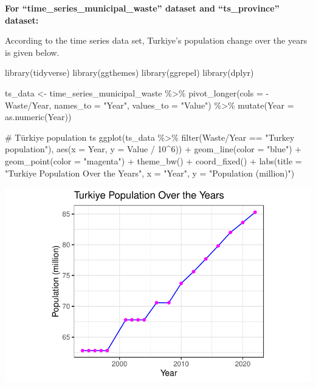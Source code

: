 \documentclass[
  11pt,
  a4paper,
  DIV=11,
  numbers=noendperiod]{scrartcl}
\newenvironment{Shaded}{\begin{snugshade}}{\end{snugshade}}
\newcommand{\AttributeTok}[1]{\textcolor[rgb]{0.40,0.45,0.13}{#1}}
\newcommand{\CommentTok}[1]{\textcolor[rgb]{0.37,0.37,0.37}{#1}}
\newcommand{\DecValTok}[1]{\textcolor[rgb]{0.68,0.00,0.00}{#1}}
\newcommand{\FunctionTok}[1]{\textcolor[rgb]{0.28,0.35,0.67}{#1}}
\newcommand{\NormalTok}[1]{\textcolor[rgb]{0.00,0.23,0.31}{#1}}
\newcommand{\OtherTok}[1]{\textcolor[rgb]{0.00,0.23,0.31}{#1}}
\newcommand{\SpecialCharTok}[1]{\textcolor[rgb]{0.37,0.37,0.37}{#1}}
\newcommand{\StringTok}[1]{\textcolor[rgb]{0.13,0.47,0.30}{#1}}
\begin{document}
{\textbf{For ``time\_series\_municipal\_waste'' dataset and
``ts\_province'' dataset:}}

According to the time series data set, Turkiye's population change over
the years is given below.

\begin{Shaded}
\begin{Highlighting}[]
\FunctionTok{library}\NormalTok{(tidyverse)}
\FunctionTok{library}\NormalTok{(ggthemes)}
\FunctionTok{library}\NormalTok{(ggrepel)}
\FunctionTok{library}\NormalTok{(dplyr)}

\NormalTok{ts\_data }\OtherTok{\textless{}{-}}\NormalTok{ time\_series\_municipal\_waste }\SpecialCharTok{\%\textgreater{}\%}
  \FunctionTok{pivot\_longer}\NormalTok{(}\AttributeTok{cols =} \SpecialCharTok{{-}}\StringTok{\textasciigrave{}}\AttributeTok{Waste/Year}\StringTok{\textasciigrave{}}\NormalTok{, }\AttributeTok{names\_to =} \StringTok{"Year"}\NormalTok{, }\AttributeTok{values\_to =} \StringTok{"Value"}\NormalTok{) }\SpecialCharTok{\%\textgreater{}\%}
  \FunctionTok{mutate}\NormalTok{(}\AttributeTok{Year =} \FunctionTok{as.numeric}\NormalTok{(Year))  }

\CommentTok{\# Türkiye population ts}
\FunctionTok{ggplot}\NormalTok{(ts\_data }\SpecialCharTok{\%\textgreater{}\%} \FunctionTok{filter}\NormalTok{(}\StringTok{\textasciigrave{}}\AttributeTok{Waste/Year}\StringTok{\textasciigrave{}} \SpecialCharTok{==} \StringTok{"Turkey population"}\NormalTok{), }
                          \FunctionTok{aes}\NormalTok{(}\AttributeTok{x =}\NormalTok{ Year, }\AttributeTok{y =}\NormalTok{ Value }\SpecialCharTok{/} \DecValTok{10}\SpecialCharTok{\^{}}\DecValTok{6}\NormalTok{)) }\SpecialCharTok{+}
  \FunctionTok{geom\_line}\NormalTok{(}\AttributeTok{color =} \StringTok{"blue"}\NormalTok{) }\SpecialCharTok{+}
  \FunctionTok{geom\_point}\NormalTok{(}\AttributeTok{color =} \StringTok{"magenta"}\NormalTok{) }\SpecialCharTok{+}
  \FunctionTok{theme\_bw}\NormalTok{() }\SpecialCharTok{+} \FunctionTok{coord\_fixed}\NormalTok{() }\SpecialCharTok{+}
  \FunctionTok{labs}\NormalTok{(}\AttributeTok{title =} \StringTok{"Turkiye Population Over the Years"}\NormalTok{, }\AttributeTok{x =} \StringTok{"Year"}\NormalTok{, }\AttributeTok{y =} \StringTok{"Population (million)"}\NormalTok{)}
\end{Highlighting}
\end{Shaded}

\includegraphics{project_files/figure-pdf/unnamed-chunk-21-1.pdf}
\end{document}
